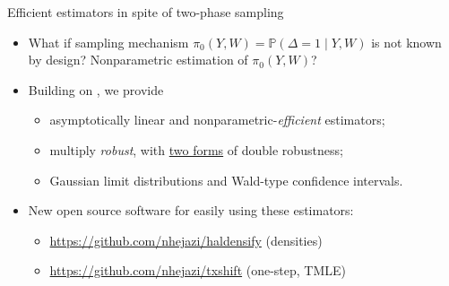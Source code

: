 \documentclass{beamer}
\newcommand{\pr}{\mathbb{P}}
\begin{document}

\begin{frame}[c]{Efficient estimators in spite of two-phase sampling}

\begin{center}
\begin{itemize}
  \itemsep10pt
  \item What if sampling mechanism $\pi_0(Y, W) = \pr(\Delta=1 \mid Y,W)$
    is not known by design? Nonparametric estimation of $\pi_0(Y, W)$?
  \item Building on \cite{rose2011targeted2sd}, we provide
    \begin{itemize}
      \itemsep4pt
      \item asymptotically linear and nonparametric-\textit{efficient}
        estimators;
      \item multiply \textit{robust}, with \underline{two forms} of double
        robustness;
      \item Gaussian limit distributions and Wald-type confidence intervals.
    \end {itemize}
  \item New open source software for easily using these estimators:
    \begin{itemize}
      \itemsep4pt
      \item \url{https://github.com/nhejazi/haldensify} (densities)
      \item \url{https://github.com/nhejazi/txshift} (one-step, TMLE)
    \end {itemize}
\end{itemize}
\end{center}


\end{frame}
\end{document}
